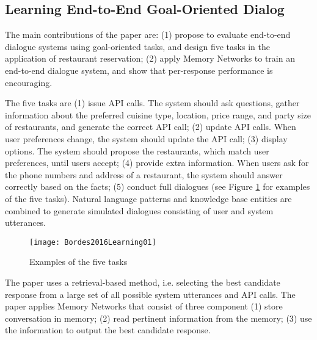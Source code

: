 \subsection{Learning End-to-End Goal-Oriented Dialog \cite{Bordes2016Learning}}

The main contributions of the paper are: (1) propose to evaluate end-to-end dialogue systems using goal-oriented tasks, and design five tasks in the application of restaurant reservation; (2) apply Memory Networks to train an end-to-end dialogue system, and show that per-response performance is encouraging.

The five tasks are (1) issue API calls. The system should ask questions, gather information about the preferred cuisine type, location, price range, and party size of restaurants, and generate the correct API call; (2) update API calls. When user preferences change, the system should update the API call; (3) display options. The system should propose the restaurants, which match user preferences, until users accept; (4) provide extra information. When users ask for the phone numbers and address of a restaurant, the system should answer correctly based on the facts; (5) conduct full dialogues (see Figure \ref{fig:Bordes2016Learning01} for examples of the five tasks). Natural language patterns and knowledge base entities are combined to generate simulated dialogues consisting of user and system utterances.

\begin{figure}[htbp]
  \centering
  \texttt{[image: Bordes2016Learning01]}\\
  \caption{Examples of the five tasks}\label{fig:Bordes2016Learning01}
\end{figure}

The paper uses a retrieval-based method, i.e. selecting the best candidate response from a large set of all possible system utterances and API calls. The paper applies Memory Networks that consist of three component (1) store conversation in memory; (2) read pertinent information from the memory; (3) use the information to output the best candidate response. 